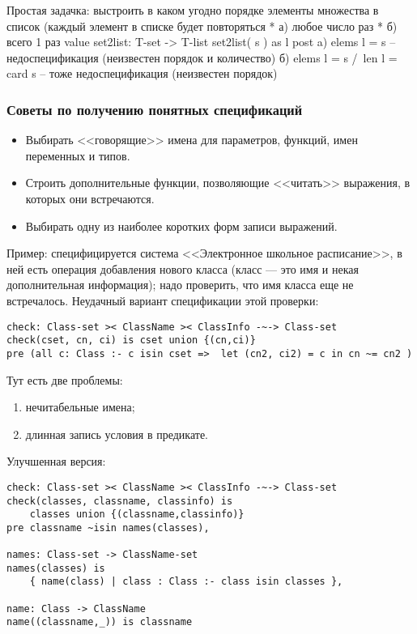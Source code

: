 \documentclass[14pt, twoside]{extreport}
\newcommand{\head}[1]{\vspace{1cm}\subsubsection*{#1}}
\begin{document}
%

Простая задачка: выстроить в каком угодно порядке элементы множества в список (каждый элемент в списке будет повторяться
  * а) любое число раз
  * б) всего 1 раз
value
    set2list: T-set -> T-list
    set2list( s ) as l
    post
    a)    elems l = s             -- недоспецификация (неизвестен порядок и количество)
    б)    elems l = s /\ len l = card s    -- тоже недоспецификация (неизвестен порядок)

\head{Советы по получению понятных спецификаций}

\begin{itemize}
    \item Выбирать <<говорящие>> имена для параметров, функций, имен переменных и типов.
    \item Строить дополнительные функции, позволяющие <<читать>> выражения, в которых они встречаются.
    \item Выбирать одну из наиболее коротких форм записи выражений.
\end{itemize}

Пример: специфицируется система <<Электронное школьное расписание>>, в ней есть операция добавления нового класса (класс --- это имя и некая дополнительная информация); надо проверить, что имя класса еще не встречалось. Неудачный вариант спецификации этой проверки:
\begin{lstlisting}
check: Class-set >< ClassName >< ClassInfo -~-> Class-set
check(cset, cn, ci) is cset union {(cn,ci)}
pre (all c: Class :- c isin cset =>  let (cn2, ci2) = c in cn ~= cn2 )
\end{lstlisting}

Тут есть две проблемы:
\begin{enumerate}
    \item нечитабельные имена;
    \item длинная запись условия в предикате.
\end{enumerate}

Улучшенная версия:
\begin{lstlisting}
check: Class-set >< ClassName >< ClassInfo -~-> Class-set
check(classes, classname, classinfo) is
    classes union {(classname,classinfo)}
pre classname ~isin names(classes),

names: Class-set -> ClassName-set
names(classes) is
    { name(class) | class : Class :- class isin classes },

name: Class -> ClassName
name((classname,_)) is classname
\end{lstlisting}
\end{document}
